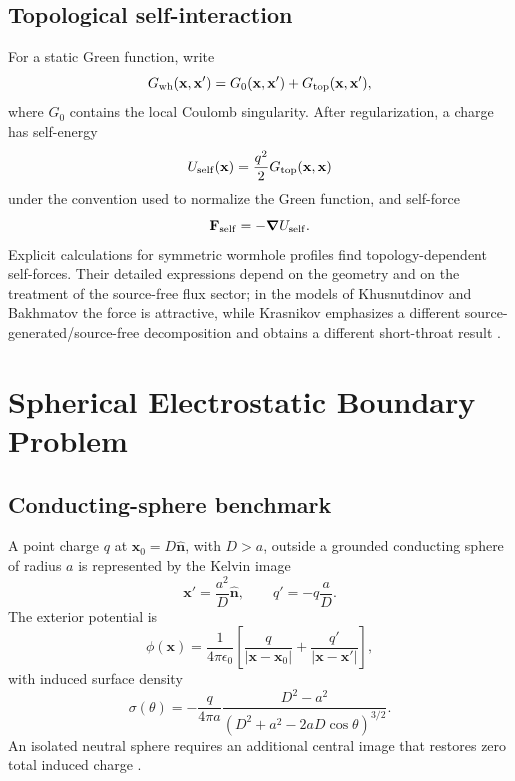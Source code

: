 \documentclass[journal,a4paper]{IEEEtran}
\begin{document}
\subsection{Topological self-interaction}

For a static Green function, write
\begin{equation}
    G_{\rm wh}(\mathbf x,\mathbf x')
    =G_0(\mathbf x,\mathbf x')
    +G_{\rm top}(\mathbf x,\mathbf x'),
\end{equation}
where \(G_0\) contains the local Coulomb singularity. After regularization, a charge has self-energy
\begin{equation}
    U_{\rm self}(\mathbf x)
    =\frac{q^2}{2}G_{\rm top}(\mathbf x,\mathbf x)
\end{equation}
under the convention used to normalize the Green function, and self-force
\begin{equation}
    \mathbf F_{\rm self}=-\boldsymbol\nabla U_{\rm self}.
\end{equation}
Explicit calculations for symmetric wormhole profiles find topology-dependent self-forces. Their detailed expressions depend on the geometry and on the treatment of the source-free flux sector; in the models of Khusnutdinov and Bakhmatov the force is attractive, while Krasnikov emphasizes a different source-generated/source-free decomposition and obtains a different short-throat result \cite{KhusnutdinovBakhmatov2007,Krasnikov2008}.

\section{Spherical Electrostatic Boundary Problem}
\label{sec:spherical_electrostatics}

\subsection{Conducting-sphere benchmark}

A point charge \(q\) at \(\mathbf x_0=D\hat{\mathbf n}\), with \(D>a\), outside a grounded conducting sphere of radius \(a\) is represented by the Kelvin image
\begin{equation}
    \mathbf x'=\frac{a^2}{D}\hat{\mathbf n},
    \qquad
    q'=-q\frac{a}{D}.
    \label{eq:kelvin_image}
\end{equation}
The exterior potential is
\begin{equation}
    \phi(\mathbf x)=\frac{1}{4\pi\epsilon_0}
    \left[
    \frac{q}{|\mathbf x-\mathbf x_0|}
    +\frac{q'}{|\mathbf x-\mathbf x'|}
    \right],
\end{equation}
with induced surface density
\begin{equation}
    \sigma(\theta)
    =-\frac{q}{4\pi a}
    \frac{D^2-a^2}
    {(D^2+a^2-2aD\cos\theta)^{3/2}}.
\end{equation}
An isolated neutral sphere requires an additional central image that restores zero total induced charge \cite{Jackson1999,Smythe1989}.
\end{document}
